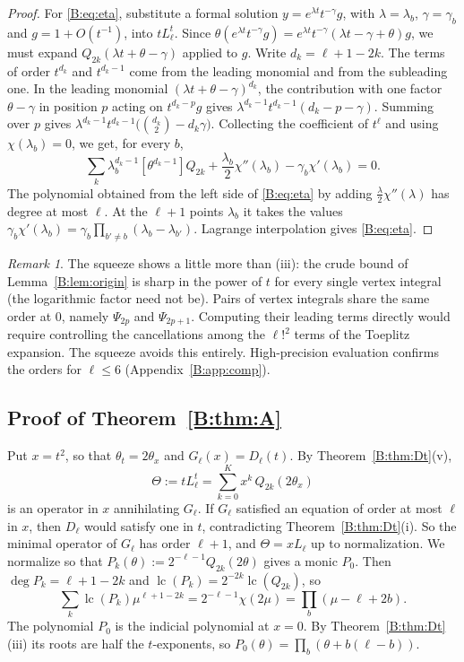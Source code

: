 \documentclass[11pt,a4paper]{article}
\theoremstyle{definition}
\theoremstyle{remark}
\newtheorem{remark}[theorem]{Remark}
\DeclareMathOperator{\lc}{lc}
\numberwithin{equation}{section}
\begin{document}
\begin{proof}
For \eqref{B:eq:eta}, substitute a formal solution $y=e^{\lambda t}t^{-\gamma}g$, with $\lambda=\lambda_b$, $\gamma=\gamma_b$ and $g=1+O(t^{-1})$, into $tL^t_\ell$. Since $\theta(e^{\lambda t}t^{-\gamma}g)=e^{\lambda t}t^{-\gamma}(\lambda t-\gamma+\theta)g$, we must expand $Q_{2k}(\lambda t+\theta-\gamma)$ applied to $g$. Write $d_k=\ell+1-2k$. The terms of order $t^{d_k}$ and $t^{d_k-1}$ come from the leading monomial and from the subleading one. In the leading monomial $(\lambda t+\theta-\gamma)^{d_k}$, the contribution with one factor $\theta-\gamma$ in position $p$ acting on $t^{d_k-p}g$ gives $\lambda^{d_k-1}t^{d_k-1}(d_k-p-\gamma)$. Summing over $p$ gives $\lambda^{d_k-1}t^{d_k-1}\bigl(\binom{d_k}2-d_k\gamma\bigr)$. Collecting the coefficient of $t^{\ell}$ and using $\chi(\lambda_b)=0$, we get, for every $b$,
\[
\sum_k\lambda_b^{d_k-1}[\theta^{d_k-1}]Q_{2k}+\frac{\lambda_b}{2}\chi''(\lambda_b)-\gamma_b\chi'(\lambda_b)=0 .
\]
The polynomial obtained from the left side of \eqref{B:eq:eta} by adding $\frac\lambda2\chi''(\lambda)$ has degree at most $\ell$. At the $\ell+1$ points $\lambda_b$ it takes the values $\gamma_b\chi'(\lambda_b)=\gamma_b\prod_{b'\ne b}(\lambda_b-\lambda_{b'})$. Lagrange interpolation gives \eqref{B:eq:eta}.
\end{proof}

\begin{remark}
The squeeze shows a little more than (iii): the crude bound of Lemma~\ref{B:lem:origin} is sharp in the power of $t$ for every single vertex integral (the logarithmic factor need not be). Pairs of vertex integrals share the same order at $0$, namely $\Psi_{2p}$ and $\Psi_{2p+1}$. Computing their leading terms directly would require controlling the cancellations among the $\ell!^2$ terms of the Toeplitz expansion. The squeeze avoids this entirely. High-precision evaluation confirms the orders for $\ell\le6$ (Appendix~\ref{B:app:comp}).
\end{remark}

\subsection{Proof of Theorem~\ref{B:thm:A}}
Put $x=t^2$, so that $\theta_t=2\theta_x$ and $G_\ell(x)=D_\ell(t)$. By Theorem~\ref{B:thm:Dt}(v),
\[
\Theta:=tL^t_\ell=\sum_{k=0}^{K}x^k\,Q_{2k}(2\theta_x)
\]
is an operator in $x$ annihilating $G_\ell$. If $G_\ell$ satisfied an equation of order at most $\ell$ in $x$, then $D_\ell$ would satisfy one in $t$, contradicting Theorem~\ref{B:thm:Dt}(i). So the minimal operator of $G_\ell$ has order $\ell+1$, and $\Theta=xL_\ell$ up to normalization. We normalize so that $P_k(\theta):=2^{-\ell-1}Q_{2k}(2\theta)$ gives a monic $P_0$. Then $\deg P_k=\ell+1-2k$ and $\lc(P_k)=2^{-2k}\lc(Q_{2k})$, so
\[
\sum_k\lc(P_k)\mu^{\ell+1-2k}=2^{-\ell-1}\chi(2\mu)=\prod_b(\mu-\ell+2b).
\]
The polynomial $P_0$ is the indicial polynomial at $x=0$. By Theorem~\ref{B:thm:Dt}(iii) its roots are half the $t$-exponents, so $P_0(\theta)=\prod_b(\theta+b(\ell-b))$.
\end{document}

